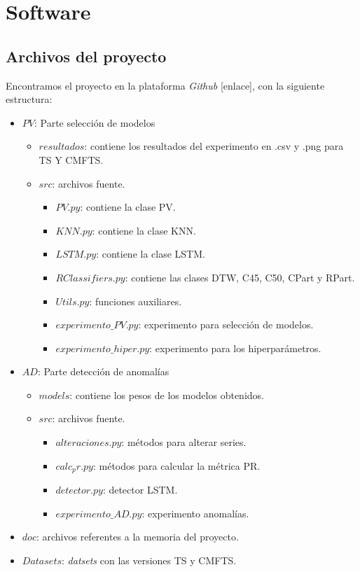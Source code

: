 
\chapter{Software}\label{ap:software}

\section{Archivos del proyecto}

Encontramos el proyecto en la plataforma \emph{Github} [enlace], con la siguiente estructura:

\begin{itemize}
  \item $PV$: Parte selección de modelos
    \begin{itemize}
      \item $resultados$: contiene los resultados del experimento en .csv y .png para TS Y CMFTS.
      \item $src$: archivos fuente.
      \begin{itemize}
        \item $PV.py$: contiene la clase PV.
        \item $KNN.py$: contiene la clase KNN.
        \item $LSTM.py$: contiene la clase LSTM.
        \item $RClassifiers.py$: contiene las clases DTW, C45, C50, CPart y RPart.
        \item $Utils.py$: funciones auxiliares.
        \item $experimento\_PV.py$: experimento para selección de modelos.
        \item $experimento\_hiper.py$: experimento para los hiperparámetros.
      \end{itemize}
    \end{itemize}
  \item $AD$: Parte detección de anomalías
    \begin{itemize}
      \item $models$: contiene los pesos de los modelos obtenidos.
      \item $src$: archivos fuente.
        \begin{itemize}
          \item $alteraciones.py$: métodos para alterar series.
          \item $calc_pr.py$: métodos para calcular la métrica PR.
          \item $detector.py$: detector LSTM.
          \item $experimento\_AD.py$: experimento anomalías.
        \end{itemize}
    \end{itemize}
  \item $doc$: archivos referentes a la memoria del proyecto.
  \item $Datasets$: \emph{datsets} con las versiones TS y CMFTS.

\end{itemize}

